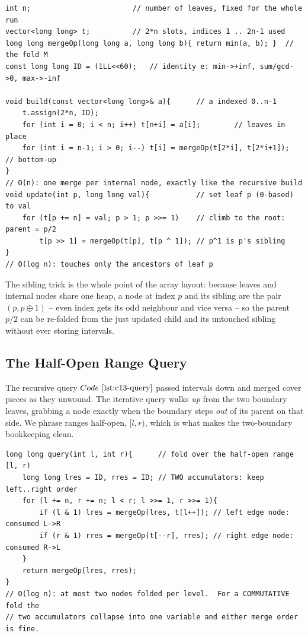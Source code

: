 \begin{lstlisting}[caption={the 2n bottom-up tree: build and point update, no recursion}, label={lst:c13-iter}]
int n;                        // number of leaves, fixed for the whole run
vector<long long> t;          // 2*n slots, indices 1 .. 2n-1 used
long long mergeOp(long long a, long long b){ return min(a, b); }  // the fold M
const long long ID = (1LL<<60);   // identity e: min->+inf, sum/gcd->0, max->-inf

void build(const vector<long long>& a){      // a indexed 0..n-1
    t.assign(2*n, ID);
    for (int i = 0; i < n; i++) t[n+i] = a[i];        // leaves in place
    for (int i = n-1; i > 0; i--) t[i] = mergeOp(t[2*i], t[2*i+1]);  // bottom-up
}
// O(n): one merge per internal node, exactly like the recursive build
void update(int p, long long val){           // set leaf p (0-based) to val
    for (t[p += n] = val; p > 1; p >>= 1)    // climb to the root: parent = p/2
        t[p >> 1] = mergeOp(t[p], t[p ^ 1]); // p^1 is p's sibling
}
// O(log n): touches only the ancestors of leaf p
\end{lstlisting}

\noindent The sibling trick  is the whole point of the
array layout: because leaves and internal nodes share one heap, a node at index
\(p\) and its sibling are the pair \((p, p\oplus 1)\) -- even index gets its odd
neighbour and vice versa -- so the parent \(p/2\) can be re-folded from the just
updated child and its untouched sibling without ever storing intervals.

\subsection{The Half-Open Range Query}

The recursive query \(\coderef{c13-query}\) passed intervals down and merged
cover pieces as they unwound.  The iterative query walks \emph{up} from the two
boundary leaves, grabbing a node exactly when the boundary steps \emph{out} of
its parent on that side.  We phrase ranges half-open, \([l,r)\), which is what
makes the two-boundary bookkeeping clean.

\begin{lstlisting}[caption={half-open range fold on the 2n tree -- order-safe for any associative combine}, label={lst:c13-iter-range}]
long long query(int l, int r){      // fold over the half-open range [l, r)
    long long lres = ID, rres = ID; // TWO accumulators: keep left..right order
    for (l += n, r += n; l < r; l >>= 1, r >>= 1){
        if (l & 1) lres = mergeOp(lres, t[l++]); // left edge node: consumed L->R
        if (r & 1) rres = mergeOp(t[--r], rres); // right edge node: consumed R->L
    }
    return mergeOp(lres, rres);
}
// O(log n): at most two nodes folded per level.  For a COMMUTATIVE fold the
// two accumulators collapse into one variable and either merge order is fine.
\end{lstlisting}

